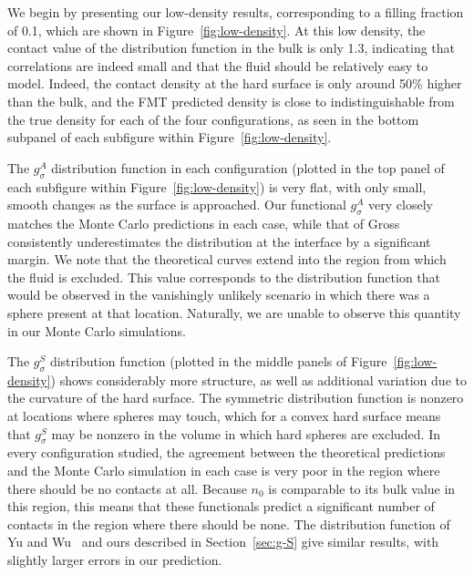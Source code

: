 We begin by presenting our low-density results, corresponding to a
filling fraction of 0.1, which are shown in
Figure~\ref{fig:low-density}.  At this low density,
the contact value of the distribution function in the bulk is only 1.3,
indicating that correlations are indeed small and that the fluid should be
relatively easy to model.  Indeed, the contact density at the hard
surface is only around 50\% higher than the bulk, and the FMT
predicted density is close to indistinguishable from the true
density for each of the four configurations, as seen in the bottom
subpanel of each subfigure within Figure~\ref{fig:low-density}.

The $g_\sigma^A$ distribution function in each configuration (plotted
in the top panel of each subfigure within Figure~\ref{fig:low-density}) is
very flat, with only small, smooth changes as the surface is approached.
Our functional $g_\sigma^A$ very closely matches the Monte Carlo
predictions in each case, while that of Gross consistently
underestimates the distribution at the interface by a significant margin.  We note that the theoretical curves
extend into the region from which the fluid is excluded.  This value
corresponds to the distribution function that would be observed in the
vanishingly unlikely scenario in which there was a sphere present at
that location.  Naturally, we are unable to observe this quantity in
our Monte Carlo simulations.

The $g_\sigma^S$ distribution function (plotted
in the middle panels of Figure~\ref{fig:low-density}) shows considerably more
structure, as well as additional variation due to the curvature of the
hard surface.  The symmetric distribution function is nonzero at
locations where spheres may touch, which for a convex hard surface
means that $g_\sigma^S$ may be nonzero in the volume in which hard
spheres are excluded.  In every configuration studied, the agreement
between the theoretical predictions and the Monte Carlo simulation in
each case is very poor in the region where there should be no contacts
at all.  Because $n_0$ is comparable to its bulk value in this region,
this means that these functionals predict a significant number of
contacts in the region where there should be none.  The distribution
function of Yu and Wu~\cite{yu2002fmt-dft-inhomogeneous-associating}
and ours described in Section~\ref{sec:g-S} give similar results, with
slightly larger errors in our prediction.

